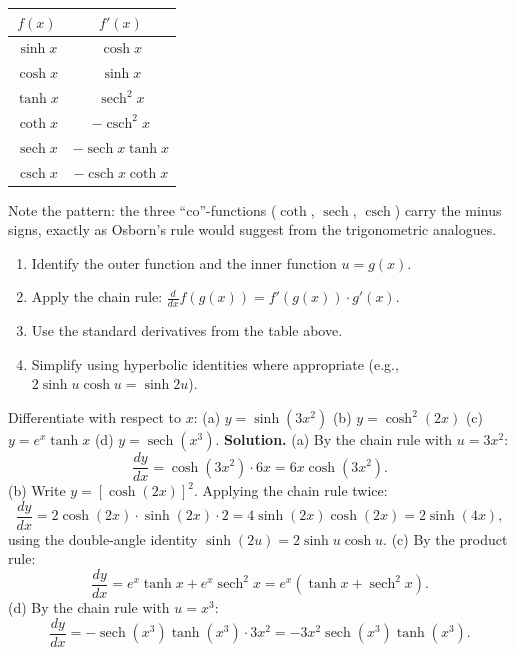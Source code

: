 \documentclass[11pt]{article}
\begin{document}
\begin{aretenir}
\begin{center}
\begin{tabular}{|c|c|}
\hline
\rowcolor{popblueL} $f(x)$ & $f'(x)$ \\
\hline
$\sinh x$ & $\cosh x$ \\
\hline
$\cosh x$ & $\sinh x$ \\
\hline
$\tanh x$ & $\operatorname{sech}^2 x$ \\
\hline
$\coth x$ & $-\operatorname{csch}^2 x$ \\
\hline
$\operatorname{sech} x$ & $-\operatorname{sech} x \tanh x$ \\
\hline
$\operatorname{csch} x$ & $-\operatorname{csch} x \coth x$ \\
\hline
\end{tabular}
\end{center}
Note the pattern: the three ``co''-functions ($\coth$, $\operatorname{sech}$, $\operatorname{csch}$) carry the minus signs, exactly as Osborn's rule would suggest from the trigonometric analogues.
\end{aretenir}

\begin{methode}
\begin{enumerate}
\item Identify the outer function and the inner function $u = g(x)$.
\item Apply the chain rule: $\frac{d}{dx}f(g(x)) = f'(g(x)) \cdot g'(x)$.
\item Use the standard derivatives from the table above.
\item Simplify using hyperbolic identities where appropriate (e.g., $2\sinh u \cosh u = \sinh 2u$).
\end{enumerate}
\end{methode}

\begin{exoresolu}
Differentiate with respect to $x$:
\quad (a) $y = \sinh(3x^2)$
\quad (b) $y = \cosh^2(2x)$
\quad (c) $y = e^x \tanh x$
\quad (d) $y = \operatorname{sech}(x^3)$.
\tcblower
\textbf{Solution.}
(a) By the chain rule with $u = 3x^2$:
\[
\frac{dy}{dx} = \cosh(3x^2) \cdot 6x = 6x\cosh(3x^2).
\]
(b) Write $y = [\cosh(2x)]^2$. Applying the chain rule twice:
\[
\frac{dy}{dx} = 2\cosh(2x) \cdot \sinh(2x) \cdot 2 = 4\sinh(2x)\cosh(2x) = 2\sinh(4x),
\]
using the double-angle identity $\sinh(2u) = 2\sinh u \cosh u$.
(c) By the product rule:
\[
\frac{dy}{dx} = e^x \tanh x + e^x \operatorname{sech}^2 x = e^x\left(\tanh x + \operatorname{sech}^2 x\right).
\]
(d) By the chain rule with $u = x^3$:
\[
\frac{dy}{dx} = -\operatorname{sech}(x^3)\tanh(x^3) \cdot 3x^2 = -3x^2 \operatorname{sech}(x^3)\tanh(x^3).
\]
\end{exoresolu}
\end{document}
